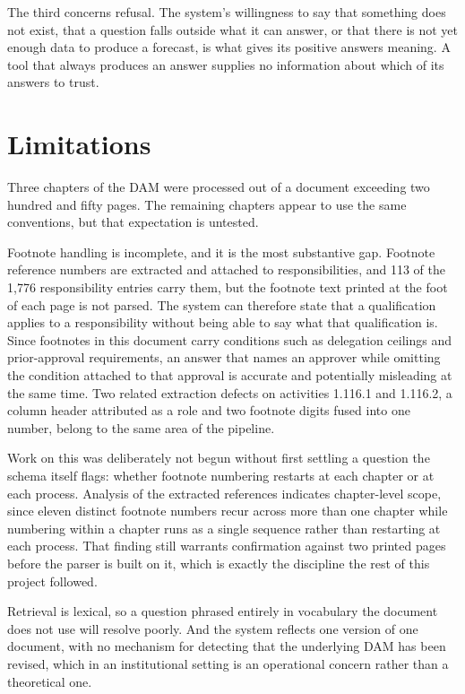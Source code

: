 The third concerns refusal. The system's willingness to say that something does not exist, that a question falls outside what it can answer, or that there is not yet enough data to produce a forecast, is what gives its positive answers meaning. A tool that always produces an answer supplies no information about which of its answers to trust.

\section*{Limitations}

Three chapters of the DAM were processed out of a document exceeding two hundred and fifty pages. The remaining chapters appear to use the same conventions, but that expectation is untested.

Footnote handling is incomplete, and it is the most substantive gap. Footnote reference numbers are extracted and attached to responsibilities, and 113 of the 1,776 responsibility entries carry them, but the footnote text printed at the foot of each page is not parsed. The system can therefore state that a qualification applies to a responsibility without being able to say what that qualification is. Since footnotes in this document carry conditions such as delegation ceilings and prior-approval requirements, an answer that names an approver while omitting the condition attached to that approval is accurate and potentially misleading at the same time. Two related extraction defects on activities 1.116.1 and 1.116.2, a column header attributed as a role and two footnote digits fused into one number, belong to the same area of the pipeline.

Work on this was deliberately not begun without first settling a question the schema itself flags: whether footnote numbering restarts at each chapter or at each process. Analysis of the extracted references indicates chapter-level scope, since eleven distinct footnote numbers recur across more than one chapter while numbering within a chapter runs as a single sequence rather than restarting at each process. That finding still warrants confirmation against two printed pages before the parser is built on it, which is exactly the discipline the rest of this project followed.

Retrieval is lexical, so a question phrased entirely in vocabulary the document does not use will resolve poorly. And the system reflects one version of one document, with no mechanism for detecting that the underlying DAM has been revised, which in an institutional setting is an operational concern rather than a theoretical one.

